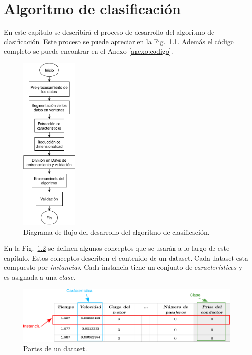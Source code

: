 \chapter{Algoritmo de clasificación}
\label{chap:algoritmo}

 \graphicspath{{Chapter5/Figuras/}{Chapter6/Figs/PDF/}{Chapter4/Figs/}}

En este capítulo se describirá el proceso de desarrollo del algoritmo de clasificación. Este proceso se puede apreciar en la Fig.~\ref{fig:Flujo_desarrollo}. Además el código completo se puede encontrar en el Anexo \ref{anexo:codigo}.

\begin{figure}[hbt!]
\centering
\includegraphics[width=0.25\textwidth]{Flujo_desarrollo.pdf}
\caption{Diagrama de flujo del desarrollo del algoritmo de clasificación.}
\label{fig:Flujo_desarrollo}
\end{figure}

En la Fig.~\ref{fig:datos_ejemplo} se definen algunos conceptos que se usarán a lo largo de este capítulo. Estos conceptos describen el contenido de un dataset. Cada dataset esta compuesto por \textit{instancias}. Cada instancia tiene un conjunto de \textit{características} y es asignada a una \textit{clase}.

\begin{figure}[hbt!]
\centering
\includegraphics[width=\textwidth]{datos_ejemplo.pdf}
\caption{Partes de un dataset.}
\label{fig:datos_ejemplo}
\end{figure}


